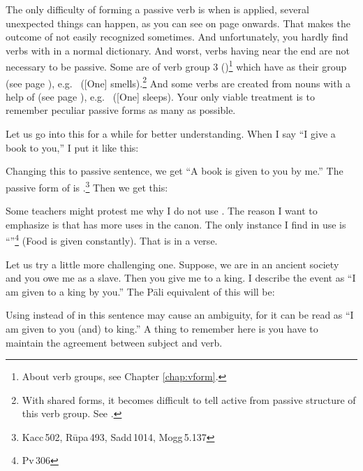 The only difficulty of forming a passive verb is when  is applied, several unexpected things can happen, as you can see on page \pageref{pacca:ya2} onwards. That makes the outcome of  not easily recognized sometimes. And unfortunately, you hardly find verbs with  in a normal dictionary. And worst, verbs having  near the end are not necessary to be passive. Some are of verb group 3 ()\footnote{About verb groups, see Chapter \ref{chap:vform}.} which have  as their group  (see page \pageref{pacca:ya1}), e.g.\  ([One] smells).\footnote{With shared  forms, it becomes difficult to tell active from passive structure of this verb group. See \citealp[p.~63]{warder:intro}.} And some verbs are created from nouns with a help of  (see page \pageref{pacca:aaya}), e.g.\  ([One] sleeps). Your only viable treatment is to remember peculiar passive forms as many as possible.

Let us go into this for a while for better understanding. When I say ``I give a book to you,'' I put it like this:


Changing this to passive sentence, we get ``A book is given to you by me.'' The passive form of  is .\footnote{Kacc\,502, R\=upa\,493, Sadd\,1014, Mogg\,5.137} Then we get this:


Some teachers might protest me why I do not use . The reason I want to emphasize is that  has more uses in the canon. The only instance I find  in use is ``''\footnote{Pv\,306} (Food is given constantly). That is in a verse.

Let us try a little more challenging one. Suppose, we are in an ancient society and you owe me as a slave. Then you give me to a king. I describe the event as ``I am given to a king by you.'' The P\=ali equivalent of this will be:


Using  instead of  in this sentence may cause an ambiguity, for it can be read as ``I am given to you (and) to king.'' A thing to remember here is you have to maintain the agreement between subject and verb.

